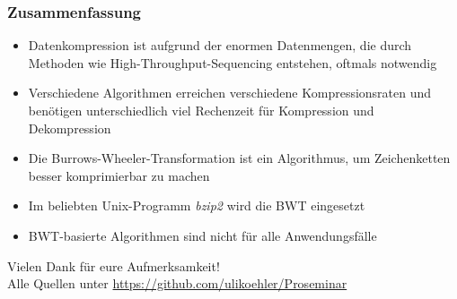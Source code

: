\documentclass[14pt,xcolor=dvipsnames,pdftex]{beamer}
\begin{document}
\begin{frame}[allowframebreaks]
 \frametitle{Zusammenfassung}
 \begin{itemize}
  \item Datenkompression ist aufgrund der enormen Datenmengen, die durch Methoden wie High-Throughput-Sequencing entstehen, oftmals notwendig
  \item Verschiedene Algorithmen erreichen verschiedene Kompressionsraten und benötigen unterschiedlich viel Rechenzeit für Kompression und Dekompression
 \end{itemize}
 \framebreak
 \begin{itemize}
  \item Die Burrows-Wheeler-Transformation ist ein Algorithmus, um Zeichenketten besser komprimierbar zu machen
  \item Im beliebten Unix-Programm \textit{bzip2} wird die BWT eingesetzt
  \item BWT-basierte Algorithmen sind nicht für alle Anwendungsfälle
  \end{itemize}
\end{frame}
\begin{frame}
 \begin{center}
  {\color{BlueViolet}\large Vielen Dank für eure Aufmerksamkeit!}\\\vspace{1cm}
  Alle Quellen unter \url{https://github.com/ulikoehler/Proseminar}
 \end{center}

\end{frame}
\end{document}
